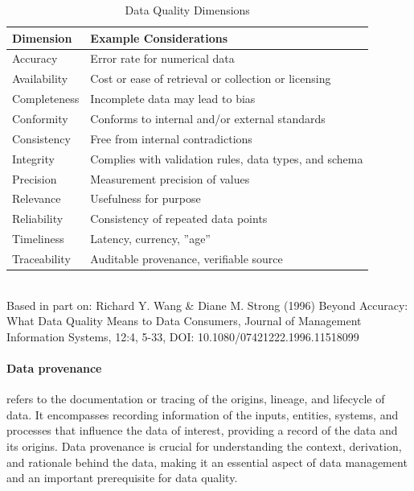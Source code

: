 \begin{table}[h]
\centering
\renewcommand{\arraystretch}{1.25}

\begin{tabular}{l|l} \hline
\textbf{Dimension} & \textbf{Example Considerations} \\ \hline \hline
Accuracy & Error rate for numerical data\\
Availability & Cost or ease of retrieval or collection or licensing \\
Completeness & Incomplete data may lead to bias \\
Conformity & Conforms to internal and/or external standards \\
Consistency & Free from internal contradictions \\
Integrity & Complies with validation rules, data types, and schema \\
Precision & Measurement precision of values \\
Relevance & Usefulness for purpose \\
Reliability & Consistency of repeated data points \\
Timeliness & Latency, currency, ''age'' \\
Traceability & Auditable provenance, verifiable source \\ \hline
\end{tabular} \\
\vspace{.5\baselineskip}
\footnotesize Based in part on: Richard Y. Wang \& Diane M. Strong (1996) Beyond Accuracy: What Data Quality Means to Data Consumers, Journal of Management Information Systems, 12:4, 5-33, DOI: 10.1080/07421222.1996.11518099 

\caption{Data Quality Dimensions}

\label{tab:dataquality}
\end{table}

\paragraph*{Data provenance} refers to the documentation or tracing of the origins, lineage, and lifecycle of data. It encompasses recording information of the inputs, entities, systems, and processes that influence the data of interest, providing a record of the data and its origins. Data provenance is crucial for understanding the context, derivation, and rationale behind the data, making it an essential aspect of data management and an important prerequisite for data quality.


